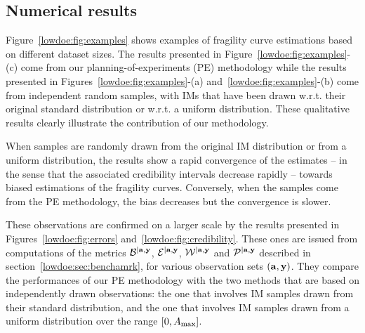 \subsection{Numerical results}\label{lowdoe:sec:results}

%
Figure~\ref{lowdoe:fig:examples} shows examples of fragility curve estimations based on different dataset sizes. 
The results presented in Figure~\ref{lowdoe:fig:examples}-(c) come from our planning-of-experiments (PE) methodology while the results presented in {Figures~\ref{lowdoe:fig:examples}-(a) and~\ref{lowdoe:fig:examples}-(b) come from independent random samples, with IMs that have been drawn w.r.t. their original standard distribution or w.r.t. a uniform distribution}. These qualitative results clearly illustrate the contribution of our methodology.


When samples are randomly drawn from the original IM distribution {or from a uniform distribution}, the results show a rapid convergence of the estimates -- in the sense that the associated credibility intervals decrease rapidly -- towards biased estimations of the fragility curves. Conversely, when the samples come from the PE methodology, the bias decreases but the convergence is slower.

These observations are confirmed on a larger scale by the results presented in Figures~\ref{lowdoe:fig:errors} and~\ref{lowdoe:fig:credibility}. 
These ones are issued from computations of the metrics $\mathcal{B}^{|\mathbf{a},\mathbf{y}}$, $\mathcal{E}^{|\mathbf{a},\mathbf{y}}$, $\mathcal{W}^{|\mathbf{a},\mathbf{y}}$ and $\mathcal{P}^{|\mathbf{a},\mathbf{y}}$ described in section~\ref{lowdoe:sec:benchamrk}, for various observation sets $(\mathbf{a},\mathbf{y})$. They compare the performances of our PE methodology with the two methods that are based on independently drawn observations: the one that involves  IM samples drawn from their standard distribution, and the one that involves IM samples drawn from a uniform distribution over the range $[0,A_{\rm max}]$.

